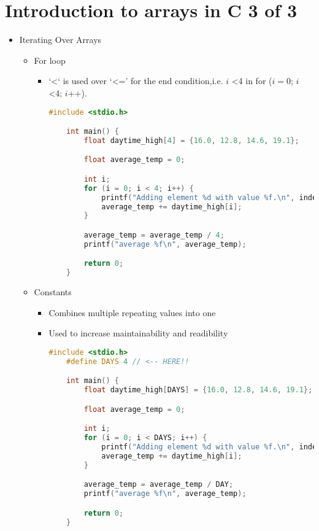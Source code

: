 \documentclass[12pt]{article}
\begin{document}
\bigskip

\section*{Introduction to arrays in C 3 of 3}

\bigskip
\begin{itemize}
    \item Iterating Over Arrays

    \begin{itemize}
    \item For loop

    \begin{itemize}
    \item `\textless` is used over `\textless=' for the end condition,i.e. $i$
    \textless 4 in for ($i = 0$; $i$ \textless 4; $i$++).

    \begin{lstlisting}[language=c]
    #include <stdio.h>

    int main() {
        float daytime_high[4] = {16.0, 12.8, 14.6, 19.1};

        float average_temp = 0;

        int i;
        for (i = 0; i < 4; i++) {
            printf("Adding element %d with value %f.\n", index, daytime_high[i]);
            average_temp += daytime_high[i];
        }

        average_temp = average_temp / 4;
        printf("average %f\n", average_temp);

        return 0;
    }
    \end{lstlisting}
    \end{itemize}

    \item Constants

    \begin{itemize}
    \item Combines multiple repeating values into one
    \item Used to increase maintainability and readibility

    \begin{lstlisting}[language=c]
    #include <stdio.h>
    #define DAYS 4 // <-- HERE!!

    int main() {
        float daytime_high[DAYS] = {16.0, 12.8, 14.6, 19.1};

        float average_temp = 0;

        int i;
        for (i = 0; i < DAYS; i++) {
            printf("Adding element %d with value %f.\n", index, daytime_high[i]);
            average_temp += daytime_high[i];
        }

        average_temp = average_temp / DAY;
        printf("average %f\n", average_temp);

        return 0;
    }
    \end{lstlisting}
    \end{itemize}

    \end{itemize}

\end{itemize}
\end{document}
